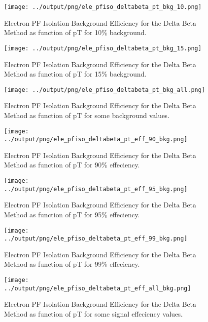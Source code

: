 \documentclass[11pt]{book}
\begin{document}
\begin{figure}[htb]
\centering
\texttt{[image: ../output/png/ele\_pfiso\_deltabeta\_pt\_bkg\_10.png]}
\caption{Electron PF Isolation Background Efficiency for the Delta Beta Method as function of pT for 10\% background.}
\label{fig:ele_pfiso_pt_bkg_deltabeta_bkg_10}
\end{figure}

\begin{figure}[htb]
\centering
\texttt{[image: ../output/png/ele\_pfiso\_deltabeta\_pt\_bkg\_15.png]}
\caption{Electron PF Isolation Background Efficiency for the Delta Beta Method as function of pT for 15\% background.}
\label{fig:ele_pfiso_pt_bkg_deltabeta_bkg_15}
\end{figure}

\begin{figure}[htb]
\centering
\texttt{[image: ../output/png/ele\_pfiso\_deltabeta\_pt\_bkg\_all.png]}
\caption{Electron PF Isolation Background Efficiency for the Delta Beta Method as function of pT for some background values.}
\label{fig:ele_pfiso_pt_bkg_deltabeta_bkg_all}
\end{figure}

\begin{figure}[htb]
\centering
\texttt{[image: ../output/png/ele\_pfiso\_deltabeta\_pt\_eff\_90\_bkg.png]}
\caption{Electron PF Isolation Background Efficiency for the Delta Beta Method as function of pT for 90\% effeciency.}
\label{fig:ele_pfiso_pt_eff_deltabeta_eff_90_bkg}
\end{figure}

\begin{figure}[htb]
\centering
\texttt{[image: ../output/png/ele\_pfiso\_deltabeta\_pt\_eff\_95\_bkg.png]}
\caption{Electron PF Isolation Background Efficiency for the Delta Beta Method as function of pT for 95\% effeciency.}
\label{fig:ele_pfiso_pt_eff_deltabeta_eff_95_bkg}
\end{figure}

\begin{figure}[htb]
\centering
\texttt{[image: ../output/png/ele\_pfiso\_deltabeta\_pt\_eff\_99\_bkg.png]}
\caption{Electron PF Isolation Background Efficiency for the Delta Beta Method as function of pT for 99\% effeciency.}
\label{fig:ele_pfiso_pt_eff_deltabeta_eff_99_bkg}
\end{figure}

\begin{figure}[htb]
\centering
\texttt{[image: ../output/png/ele\_pfiso\_deltabeta\_pt\_eff\_all\_bkg.png]}
\caption{Electron PF Isolation Background Efficiency for the Delta Beta Method as function of pT for some signal effeciency values.}
\label{fig:ele_pfiso_pt_eff_deltabeta_eff_all_bkg}
\end{figure}
\clearpage
\end{document}
